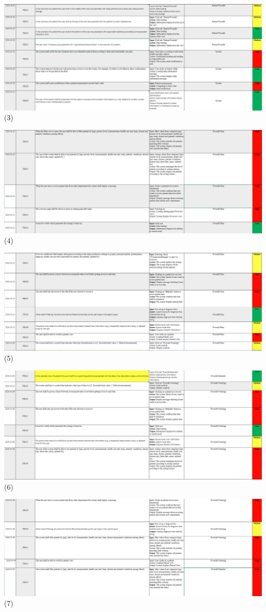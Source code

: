     \vfill
\includegraphics[width=\linewidth]{Pictures/Func3.PNG} (3)

    \vfill
\includegraphics[width=\linewidth]{Pictures/Func4} (4)

    \vfill
\includegraphics[width=\linewidth]{Pictures/Func5} (5)

    \vfill
\includegraphics[width=\linewidth]{Pictures/Func6} (6)

    \vfill
\includegraphics[width=\linewidth]{Pictures/Func7} (7)

